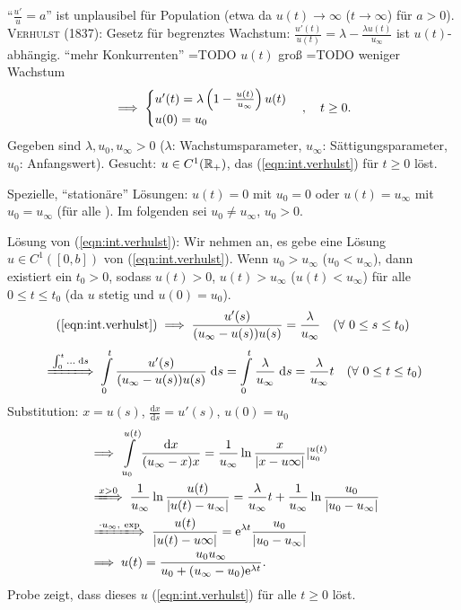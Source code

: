 \documentclass[12pt]{scrreprt}
\begin{document}
\noindent "`$\frac{u'}{u}=a$"' ist unplausibel für Population (etwa da
$u(t)\to\infty$ ($t\to\infty$) für $a>0$). \textsc{Verhulst} (1837):
Gesetz für begrenztes Wachstum:
$\frac{u'(t)}{u(t)}=\lambda-\frac{\lambda u(t)}{u_\infty}$ ist
$u(t)$-abhängig. "`mehr Konkurrenten"' =TODO $u(t)$ groß =TODO weniger
Wachstum
\begin{equation} \label{eqn:int.verhulst}
  \implies \begin{cases} u'(t) =
  \lambda\left(1-\frac{u(t)}{u_\infty}\right)u(t) \\
  u(0)=u_0 \end{cases} ,\quad t \ge 0.
\end{equation}
Gegeben sind $\lambda, u_0, u_\infty>0$ ($\lambda$:
Wachstumsparameter, $u_\infty$: Sättigungsparameter, $u_0$:
Anfangswert). Gesucht: $u\in C^1(\mathbb{R}_+)$, das
(\ref{eqn:int.verhulst}) für $t\ge0$ löst.

\begin{bem*}
  Spezielle, "`stationäre"' Lösungen: $u(t)=0$ mit $u_0=0$ oder
  $u(t)=u_\infty$ mit $u_0=u_\infty$ (für alle ). Im
  folgenden sei $u_0\neq u_\infty$, $u_0>0$.
\end{bem*}

\noindent Lösung von (\ref{eqn:int.verhulst}):  Wir nehmen an, es
gebe eine Lösung $u\in C^1([0,b])$ von (\ref{eqn:int.verhulst}). Wenn
$u_0>u_\infty$ ($u_0<u_\infty$), dann existiert ein $t_0>0$, sodass
$u(t)>0$, $u(t)>u_\infty$ ($u(t)<u_\infty$) für alle $0\le t\le t_0$
(da $u$ stetig und $u(0)=u_0$).
\[(\ref{eqn:int.verhulst}) \implies \frac{u'(s)}{(u_\infty-u(s))u(s)} =
\frac{\lambda}{u_\infty}\quad (\forall\ 0\le s \le t_0)\]
\[\folgtwegen{\integral{0}{t}{\dotsc}{s}}
\Integral{0}{t}{\frac{u'(s)}{(u_\infty-u(s))u(s)}}{s} =
\Integral{0}{t}{\frac{\lambda}{u_\infty}}{s}=\frac{\lambda}{u_\infty}t
\quad (\forall\ 0\le t \le t_0)\]
Substitution: $x=u(s)$, $\frac{\mathrm{d}x}{\mathrm{d}s}=u'(s)$,
$u(0)=u_0$
\begin{align*}&\folgt \int\limits_{u_0}^{u(t)}{\frac{\mathrm{d}x}{(u_\infty-x)x}} =
\frac{1}{u_\infty} \ln{\frac{x}{\abs{x-u\infty}}}|_{u_0}^{u(t)}\\
&\folgtwegen{x>0}\frac{1}{u_\infty}
\ln{\frac{u(t)}{\abs{u(t)-u_\infty}}} = \frac{\lambda}{u_\infty}t +
\frac{1}{u_\infty} \ln{\frac{u_0}{\abs{u_0-u_\infty}}}\\
&\folgtwegen{\cdot u_\infty,\ \exp} \frac{u(t)}{\abs{u(t)-u\infty}} =
\e^{\lambda t} \frac{u_0}{\abs{u_0-u_\infty}}\\
&\folgt u(t) = \frac{u_0u_\infty}{u_0+(u_\infty-u_0)\e^{\lambda t}}.
\end{align*}
Probe zeigt, dass dieses $u$ (\ref{eqn:int.verhulst}) für alle $t\ge0$
löst.
\end{document}
